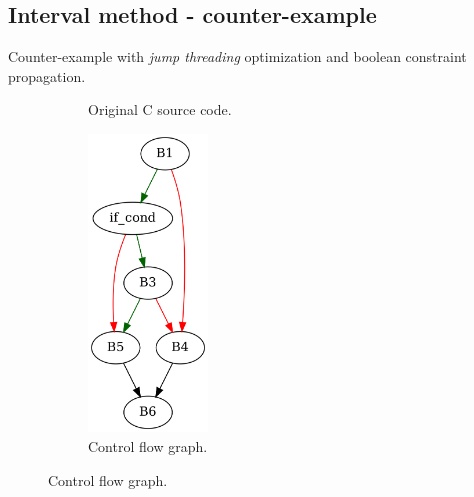 
\clearpage

\subsection{Interval method - counter-example}

Counter-example with \textit{jump threading} optimization and boolean constraint propagation.

\begin{figure}[htbp]
	\centering
	\begin{subfigure}[b]{0.30\textwidth}
		\centering
		
		\caption{Original C source code.}
	\end{subfigure}
	\begin{subfigure}[b]{0.50\textwidth}
		\centering
		\includegraphics[width=0.35\textwidth]{inc/appendices/examples/interval/counter-example/bool_propagation_jump/f.png}
		\caption{Control flow graph.}
	\end{subfigure}
\end{figure}

